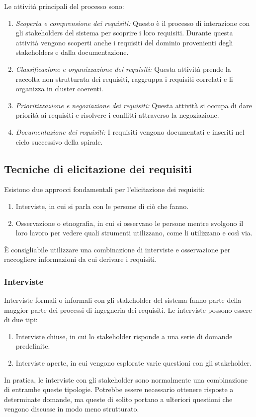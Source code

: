 Le attività principali del processo sono:
\begin{enumerate}
    \item \textit{Scoperta e comprensione dei requisiti:} Questo è il processo di interazione con gli stakeholders del sistema per scoprire i loro requisiti. Durante questa attività vengono scoperti anche i requisiti del dominio provenienti degli stakeholders e dalla documentazione.
    \item \textit{Classificazione e organizzazione dei requisiti:} Questa attività prende la raccolta non strutturata dei requisiti, raggruppa i requisiti correlati e li organizza in cluster coerenti.
    \item \textit{Prioritizzazione e negoziazione dei requisiti:} Questa attività si occupa di dare priorità ai requisiti e risolvere i conflitti attraverso la negoziazione.
    \item \textit{Documentazione dei requisiti:} I requisiti vengono documentati e inseriti nel ciclo successivo della spirale.
\end{enumerate}

\subsection{Tecniche di elicitazione dei requisiti}
Esistono due approcci fondamentali per l'elicitazione dei requisiti:
\begin{enumerate}
    \item Interviste, in cui si parla con le persone di ciò che fanno.
    \item Osservazione o etnografia, in cui si osservano le persone mentre svolgono il loro lavoro per vedere quali strumenti utilizzano, come li utilizzano e così via.
\end{enumerate}
È consigliabile utilizzare una combinazione di interviste e osservazione per raccogliere informazioni da cui derivare i requisiti.

\subsubsection{Interviste}
Interviste formali o informali con gli stakeholder del sistema fanno parte della maggior parte dei processi di ingegneria dei requisiti. Le interviste possono essere di due tipi:
\begin{enumerate}
    \item Interviste chiuse, in cui lo stakeholder risponde a una serie di domande predefinite.
    \item Interviste aperte, in cui vengono esplorate varie questioni con gli stakeholder.
\end{enumerate}
In pratica, le interviste con gli stakeholder sono normalmente una combinazione di entrambe queste tipologie. Potrebbe essere necessario ottenere risposte a determinate domande, ma queste di solito portano a ulteriori questioni che vengono discusse in modo meno strutturato. 


